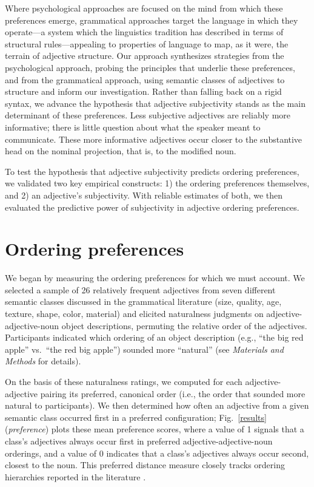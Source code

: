 \documentclass{pnastwo}
\begin{document}
\begin{article}
Where psychological approaches are focused on the mind from which these preferences emerge, grammatical approaches target the language in which they operate---a system which the linguistics tradition has described in terms of structural rules---appealing to properties of language to map, as it were, the terrain of adjective structure. Our approach synthesizes strategies from the psychological approach, probing the principles that underlie these preferences, and from the grammatical approach, using semantic classes of adjectives to structure and inform our investigation. Rather than falling back on a rigid syntax, we advance the hypothesis that adjective subjectivity stands as the main determinant of these preferences. Less subjective adjectives are reliably more informative; there is little question about what the speaker meant to communicate. These more informative adjectives occur closer to the substantive head on the nominal projection, that is, to the modified noun.

To test the hypothesis that adjective subjectivity predicts ordering preferences, we validated two key empirical constructs: 1) the ordering preferences themselves, and 2) an adjective's subjectivity. With reliable estimates of both, we then evaluated the predictive power of subjectivity in adjective ordering preferences.

\section{Ordering preferences}

We began by measuring the ordering preferences for which we must account. We selected a sample of 26 relatively frequent adjectives from seven different semantic classes discussed in the grammatical literature (size, quality, age, texture, shape, color, material) and elicited naturalness judgments on adjective-adjective-noun object descriptions, permuting the relative order of the adjectives. Participants indicated which ordering of an object description (e.g., ``the big red apple'' vs.\ ``the red big apple'') sounded more ``natural'' (see \emph{Materials and Methods} for details).

On the basis of these naturalness ratings, we computed for each adjective-adjective pairing its preferred, canonical order (i.e., the order that sounded more natural to participants). We then determined how often an adjective from a given semantic class occurred first in a preferred  configuration; Fig.\ \ref{results} (\emph{preference}) plots these mean preference scores, where a value of 1 signals that a class's adjectives always occur first in preferred adjective-adjective-noun orderings, and a value of 0 indicates that a class's adjectives always occur second, closest to the noun. This preferred distance measure closely tracks ordering hierarchies reported in the literature \cite{dixon1982,sproatshih1991}.


\end{article}
\end{document}
